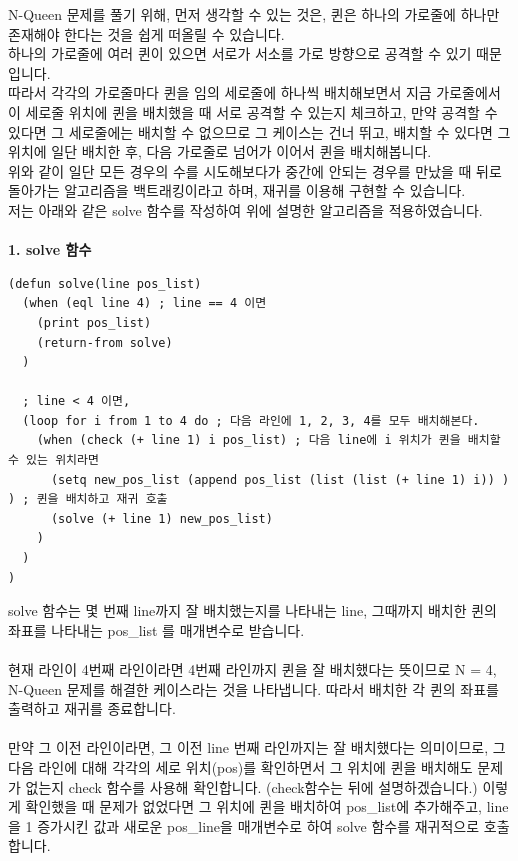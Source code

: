 \documentclass{article}
\begin{document}
\quad N-Queen 문제를 풀기 위해, 먼저 생각할 수 있는 것은, 퀸은 하나의 가로줄에 하나만 존재해야 한다는 것을 쉽게 떠올릴 수 있습니다.\\
하나의 가로줄에 여러 퀸이 있으면 서로가 서소를 가로 방향으로 공격할 수 있기 때문입니다.\\
따라서 각각의 가로줄마다 퀸을 임의 세로줄에 하나씩 배치해보면서 지금 가로줄에서 이 세로줄 위치에 퀸을 배치했을 때 서로 공격할 수 있는지 체크하고, 만약 공격할 수 있다면 그 세로줄에는 배치할 수 없으므로 그 케이스는 건너 뛰고, 배치할 수 있다면 그 위치에 일단 배치한 후, 다음 가로줄로 넘어가 이어서 퀸을 배치해봅니다.\\
위와 같이 일단 모든 경우의 수를 시도해보다가 중간에 안되는 경우를 만났을 때 뒤로 돌아가는 알고리즘을 백트래킹이라고 하며, 재귀를 이용해 구현할 수 있습니다.\\
저는 아래와 같은 solve 함수를 작성하여 위에 설명한 알고리즘을 적용하였습니다.\\\\
\textbf{1. solve 함수}\\
\begin{verbatim}
(defun solve(line pos_list)
  (when (eql line 4) ; line == 4 이면
    (print pos_list)
    (return-from solve)
  )

  ; line < 4 이면,
  (loop for i from 1 to 4 do ; 다음 라인에 1, 2, 3, 4를 모두 배치해본다.
    (when (check (+ line 1) i pos_list) ; 다음 line에 i 위치가 퀸을 배치할 수 있는 위치라면
      (setq new_pos_list (append pos_list (list (list (+ line 1) i)) ) ) ; 퀸을 배치하고 재귀 호출
      (solve (+ line 1) new_pos_list)
    )
  )
)
\end{verbatim}
solve 함수는 몇 번째 line까지 잘 배치했는지를 나타내는 line, 그때까지 배치한 퀸의 좌표를 나타내는 pos\_list 를 매개변수로 받습니다.\\\\
현재 라인이 4번째 라인이라면 4번째 라인까지 퀸을 잘 배치했다는 뜻이므로 N = 4, N-Queen 문제를 해결한 케이스라는 것을 나타냅니다. 따라서 배치한 각 퀸의 좌표를 출력하고 재귀를 종료합니다.\\\\
만약 그 이전 라인이라면, 그 이전 line 번째 라인까지는 잘 배치했다는 의미이므로, 그 다음 라인에 대해 각각의 세로 위치(pos)를 확인하면서 그 위치에 퀸을 배치해도 문제가 없는지 check 함수를 사용해 확인합니다. (check함수는 뒤에 설명하겠습니다.) 이렇게 확인했을 때 문제가 없었다면 그 위치에 퀸을 배치하여 pos\_list에 추가해주고, line을 1 증가시킨 값과 새로운 pos\_line을 매개변수로 하여 solve 함수를 재귀적으로 호출합니다.\\\\
\end{document}
